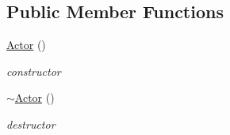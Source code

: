 \subsection*{Public Member Functions}
\begin{DoxyCompactItemize}
\item 
\hypertarget{classContent_1_1Actor_1_1Renderer_1_1Actor_a970f975d1afe0edbdc2cc84c1468605b}{
\hyperlink{classContent_1_1Actor_1_1Renderer_1_1Actor_a970f975d1afe0edbdc2cc84c1468605b}{Actor} ()}
\label{classContent_1_1Actor_1_1Renderer_1_1Actor_a970f975d1afe0edbdc2cc84c1468605b}

\begin{DoxyCompactList}\small\item\em constructor \item\end{DoxyCompactList}\item 
\hypertarget{classContent_1_1Actor_1_1Renderer_1_1Actor_aec6290b9e05f5fffde6578c50e18b333}{
\hyperlink{classContent_1_1Actor_1_1Renderer_1_1Actor_aec6290b9e05f5fffde6578c50e18b333}{$\sim$Actor} ()}
\label{classContent_1_1Actor_1_1Renderer_1_1Actor_aec6290b9e05f5fffde6578c50e18b333}

\begin{DoxyCompactList}\small\item\em destructor \item\end{DoxyCompactList}\end{DoxyCompactItemize}
